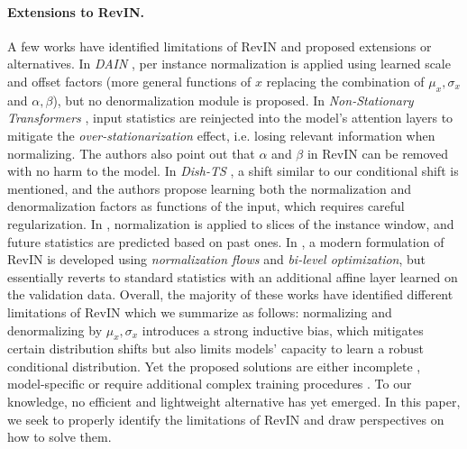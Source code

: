 \paragraph{Extensions to RevIN.}  A few works have identified limitations of RevIN and proposed extensions or alternatives. In \textit{DAIN} \citep{dain}, per instance normalization is applied using learned scale and offset factors (more general functions of $x$ replacing the combination of $\mu_x,\sigma_x$ and $\alpha,\beta$), but no denormalization module is proposed. In \textit{Non-Stationary Transformers} \citep{nonstattransfo}, input statistics are reinjected into the model's attention layers to mitigate the \textit{over-stationarization} effect, i.e. losing relevant information when normalizing. The authors also point out that $\alpha$ and $\beta$ in RevIN can be removed with no harm to the model. In \textit{Dish-TS} \citep{dishts}, a shift similar to our conditional shift is mentioned, and the authors propose learning both the normalization and denormalization factors as functions of the input, which requires careful regularization. In \citet{san}, normalization is applied to slices of the instance window, and future statistics are predicted based on past ones. In \citet{inflow}, a modern formulation of RevIN is developed using \textit{normalization flows} and \textit{bi-level optimization}, but essentially reverts to standard statistics with an additional affine layer learned on the validation data.  Overall, the majority of these works have identified different limitations of RevIN which we summarize as follows: normalizing and denormalizing by $\mu_x,\sigma_x$ introduces a strong inductive bias, which mitigates certain distribution shifts but also limits models' capacity to learn a robust conditional distribution. Yet the proposed solutions are either incomplete \citep{dain}, model-specific \citep{nonstattransfo} or require additional complex training procedures \citep{dishts,san,inflow}. To our knowledge, no efficient and lightweight alternative has yet emerged. In this paper, we seek to properly identify the limitations of RevIN and draw perspectives on how to solve them.
